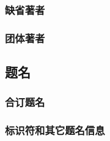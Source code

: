 \documentclass{article}
\begin{document}
\subsubsection{缺省著者}
\begin{refsection}
\nocite{anon1981-628}
\printbibliography[heading=subbibliography,title={作者姓名示例}]
\end{refsection}

\subsubsection{团体著者}
\begin{refsection}
\nocite{中国科学院物理研究所--}
\nocite{贵州省土穰普查办公室--}
\nocite{AmericanChemicalSociety--}
\nocite{StanfordUniversity--}
\end{refsection}

\subsection{题名}
\begin{refsection}
\nocite{王夫之的诠释--}
\nocite{张子正蒙注--}
\nocite{化学动力学和反应器原理--}
\nocite{袖珍神学--}
\nocite{北京师范大学学报--}
\nocite{Gasesinsea--}
\nocite{jmath--}
\end{refsection}

\subsubsection{合订题名}
\begin{refsection}
\nocite{为人民服务--}
\nocite{大趋势--}
\end{refsection}


\subsubsection{标识符和其它题名信息}
\begin{refsection}
\nocite{地壳运动--}
\nocite{三松堂--}
\nocite{世界出版业--}
\nocite{ECL集成电路--}
\nocite{中国科学技术史--}
\nocite{商鞅战秋菊--}
\nocite{中国科学--}
\nocite{信息与文献--}
\nocite{中子反射--}
\nocite{AsianPacificjournal--}
\end{refsection}
\end{document}
